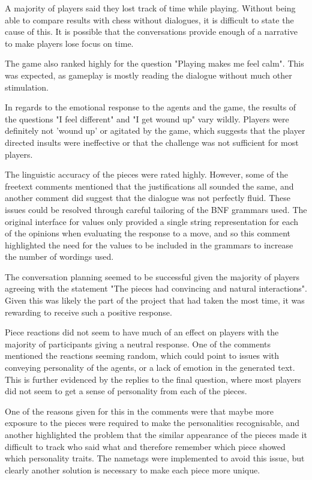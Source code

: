 \documentclass{article}
\begin{document}
A majority of players said they lost track of time while playing. Without being able to compare results with chess without dialogues, it is difficult to state the cause of this. It is possible that the conversations provide enough of a narrative to make players lose focus on time. 

The game also ranked highly for the question "Playing makes me feel calm". This was expected, as gameplay is mostly reading the dialogue without much other stimulation.

In regards to the emotional response to the agents and the game, the results of the questions "I feel different" and "I get wound up" vary wildly. Players were definitely not 'wound up' or agitated by the game, which suggests that the player directed insults were ineffective or that the challenge was not sufficient for most players.


The linguistic accuracy of the pieces were rated highly. However, some of the freetext comments mentioned that the justifications all sounded the same, and another comment did suggest that the dialogue was not perfectly fluid. These issues could be resolved through careful tailoring of the BNF grammars used. The original interface for values only provided a single string representation for each of the opinions when evaluating the response to a move, and so this comment highlighted the need for the values to be included in the grammars to increase the number of wordings used.

The conversation planning seemed to be successful given the majority of players agreeing with the statement "The pieces had convincing and natural interactions". Given this was likely the part of the project that had taken the most time, it was rewarding to receive such a positive response.

Piece reactions did not seem to have much of an effect on players with the majority of participants giving a neutral response. One of the comments mentioned the reactions seeming random, which could point to issues with conveying personality of the agents, or a lack of emotion in the generated text. This is further evidenced by the replies to the final question, where most players did not seem to get a sense of personality from each of the pieces.

One of the reasons given for this in the comments were that maybe more exposure to the pieces were required to make the personalities recognisable, and another highlighted the problem that the similar appearance of the pieces made it difficult to track who said what and therefore remember which piece showed which personality traits. The nametags were implemented to avoid this issue, but clearly another solution is necessary to make each piece more unique.
\end{document}
